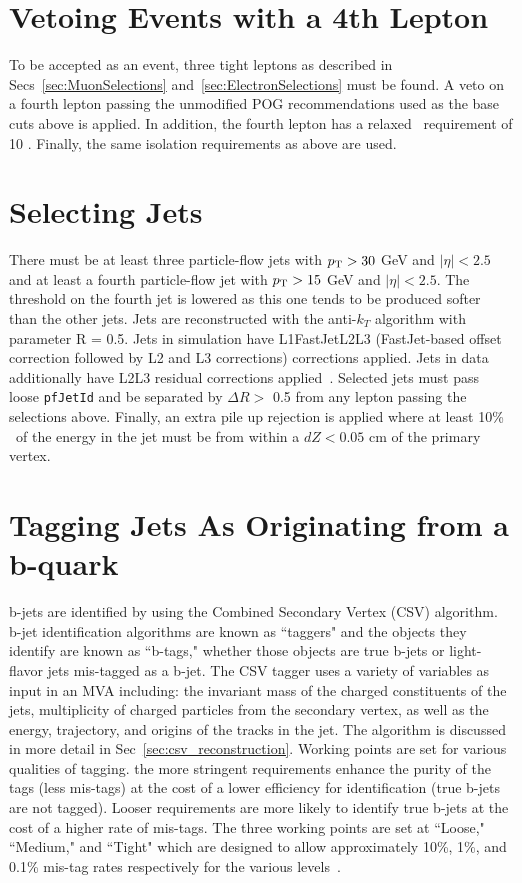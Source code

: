\section{Vetoing Events with a 4th Lepton}
\label{sec:4thLeptonVeto}
To be accepted as an event, three tight leptons as described in Secs~\ref{sec:MuonSelections} and~\ref{sec:ElectronSelections} must be found. A veto on a fourth lepton passing the unmodified POG recommendations used as the base cuts above is applied. In addition, the fourth lepton has a relaxed \pt \ requirement of 10 \GeV. Finally, the same isolation requirements as above are used.

\section{Selecting Jets}
\label{sec:JetSelection}
There must be at least three particle-flow jets with $p_{\mathrm{T}} > 30$ GeV and $|\eta| < 2.5$ and at least a fourth particle-flow jet with $p_{\mathrm{T}} > 15$ GeV and $|\eta| < 2.5$. The threshold on the fourth jet is lowered as this one tends to be produced softer than the other jets.
Jets are reconstructed with the anti-$k_{T}$ algorithm with parameter R = 0.5.  
Jets in simulation have L1FastJetL2L3 (FastJet-based offset correction followed by L2 and L3 corrections) corrections applied.  
Jets in data additionally have L2L3 residual corrections applied~\cite{jetcorrectionstwiki}. 
Selected jets must pass loose {\tt pfJetId} and be separated by $\Delta R >$ 0.5 from any lepton passing the selections above. Finally, an extra pile up rejection is applied where at least 10\% \ of the energy in the jet must be from within a $dZ < 0.05$ cm of the primary vertex.\\

\section{Tagging Jets As Originating from a b-quark}
\label{sec:bTagSelection}

b-jets are identified by using the Combined Secondary Vertex (CSV) algorithm. b-jet identification algorithms are known as ``taggers" and the objects they identify are known as ``b-tags," whether those objects are true b-jets or light-flavor jets mis-tagged as a b-jet. The CSV tagger uses a variety of variables as input in an MVA including: the invariant mass of the charged constituents of the jets, multiplicity of charged particles from the secondary vertex, as well as the energy, trajectory, and origins of the tracks in the jet. The algorithm is discussed in more detail in Sec~\ref{sec:csv_reconstruction}. Working points are set for various qualities of tagging. the more stringent requirements enhance the purity of the tags (less mis-tags) at the cost of a lower efficiency for identification (true b-jets are not tagged). Looser requirements are more likely to identify true b-jets at the cost of a higher rate of mis-tags. The three working points are set at ``Loose," ``Medium," and ``Tight" which are designed to allow approximately 10\%, 1\%, and 0.1\% mis-tag rates respectively for the various levels~\cite{btagging}.\\

